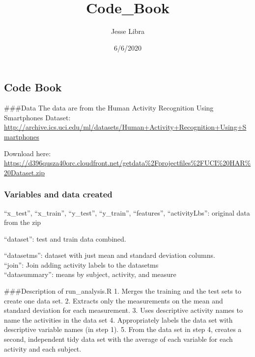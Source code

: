 \documentclass[
]{article}
\title{Code\_Book}
\author{Jesse Libra}
\date{6/6/2020}
\begin{document}
\maketitle

\hypertarget{code-book}{%
\subsection{Code Book}\label{code-book}}

\#\#\#Data The data are from the Human Activity Recognition Using
Smartphones Dataset:
\url{http://archive.ics.uci.edu/ml/datasets/Human+Activity+Recognition+Using+Smartphones}

Download here:
\url{https://d396qusza40orc.cloudfront.net/getdata\%2Fprojectfiles\%2FUCI\%20HAR\%20Dataset.zip}

\hypertarget{variables-and-data-created}{%
\subsubsection{Variables and data
created}\label{variables-and-data-created}}

``x\_test'', ``x\_train'', ``y\_test'', ``y\_train'', ``features'',
``activityLbs'': original data from the zip

``dataset'': test and train data combined.

``datasetms'': dataset with just mean and standard deviation columns.\\
``join'': Join adding activity labels to the datasetms\\
``datasummary'': means by subject, activity, and measure

\#\#\#Description of run\_analysis.R 1. Merges the training and the test
sets to create one data set. 2. Extracts only the measurements on the
mean and standard deviation for each measurement. 3. Uses descriptive
activity names to name the activities in the data set 4. Appropriately
labels the data set with descriptive variable names (in step 1). 5. From
the data set in step 4, creates a second, independent tidy data set with
the average of each variable for each activity and each subject.
\end{document}
